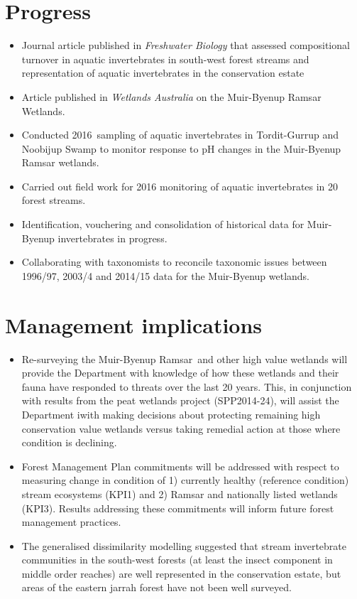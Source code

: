 \documentclass[version=last,
    paper=a4, %
    10pt, %
    usenames,
    dvipsnames,
    oneside, %
    headings=openany, %
    DIV=15 %
]{scrbook}
\begin{document}
\section*{Progress}

\begin{itemize}
\itemsep1pt\parskip0pt
\item
  Journal article published in \emph{Freshwater Biology} that assessed
  compositional turnover in aquatic invertebrates in south-west forest
  streams and representation of aquatic invertebrates in the
  conservation estate~
\item
  Article published in \emph{Wetlands Australia} on the Muir-Byenup
  Ramsar Wetlands.
\item
  Conducted 2016~sampling of aquatic invertebrates in Tordit-Gurrup and
  Noobijup Swamp to monitor response to pH changes in the Muir-Byenup
  Ramsar wetlands.
\item
  Carried out field work for 2016 monitoring of aquatic invertebrates in
  20 forest streams.
\item
  Identification, vouchering and consolidation of historical data for
  Muir-Byenup invertebrates in progress.
\item
  Collaborating with taxonomists to reconcile taxonomic issues between
  1996/97, 2003/4 and 2014/15 data for the Muir-Byenup wetlands.
\end{itemize}




\section*{Management implications}

\begin{itemize}
\itemsep1pt\parskip0pt
\item
  Re-surveying the Muir-Byenup Ramsar~and other high value wetlands will
  provide the Department with knowledge of how these wetlands and their
  fauna have responded to threats over the last 20 years. This, in
  conjunction with results from the peat wetlands project (SPP2014-24),
  will assist the Department iwith making decisions about protecting
  remaining high conservation value wetlands versus taking remedial
  action at those where condition is declining.
\item
  Forest Management Plan commitments will be addressed with respect to
  measuring change in condition of 1) currently healthy (reference
  condition) stream ecosystems (KPI1) and 2) Ramsar and nationally
  listed wetlands (KPI3). Results addressing these commitments will
  inform future forest management practices.
\item
  The generalised dissimilarity modelling suggested that stream
  invertebrate communities in the south-west forests (at least the
  insect component in middle order reaches) are well represented in the
  conservation estate, but areas of the eastern jarrah forest have not
  been well surveyed.
\end{itemize}
\end{document}
